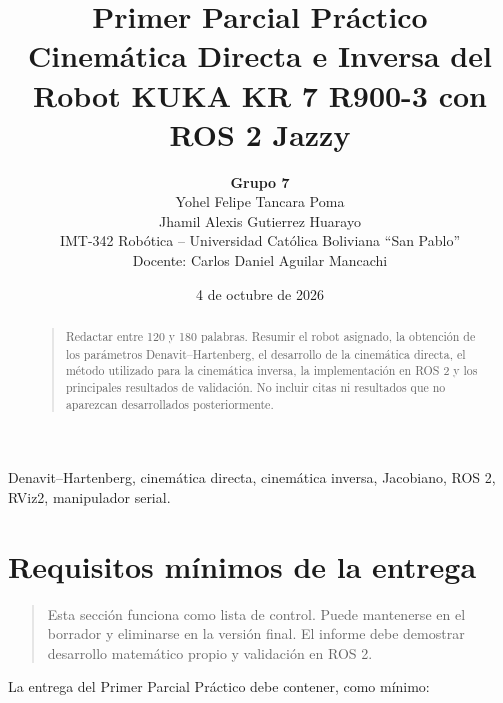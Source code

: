 \documentclass[journal]{IEEEtran}
\title{Primer Parcial Práctico\\
Cinemática Directa e Inversa del Robot KUKA KR 7 R900-3 con ROS 2 Jazzy}
\author{
\textbf{Grupo 7}\\
Yohel Felipe Tancara Poma\\
Jhamil Alexis Gutierrez Huarayo\\
IMT-342 Robótica -- Universidad Católica Boliviana ``San Pablo''\\
Docente: Carlos Daniel Aguilar Mancachi
}
\date{4 de octubre de 2026}
\newcommand{\instr}[1]{%
\begin{quote}
\small
\noindent\textbf{\color{blue}{INSTRUCCIÓN:}} #1
\end{quote}
}
\newcommand{\pendiente}[1]{\textbf{\color{red}{[#1]}}}
\begin{document}
\maketitle

\begin{abstract}
\instr{Redactar entre 120 y 180 palabras. Resumir el robot asignado, la obtención de los parámetros Denavit--Hartenberg, el desarrollo de la cinemática directa, el método utilizado para la cinemática inversa, la implementación en ROS 2 y los principales resultados de validación. No incluir citas ni resultados que no aparezcan desarrollados posteriormente.}

\pendiente{REEMPLAZAR POR EL RESUMEN DEL GRUPO.}
\end{abstract}

\begin{IEEEkeywords}
Denavit--Hartenberg, cinemática directa, cinemática inversa, Jacobiano, ROS 2, RViz2, manipulador serial.
\end{IEEEkeywords}

\section{Requisitos mínimos de la entrega}

\instr{Esta sección funciona como lista de control. Puede mantenerse en el borrador y eliminarse en la versión final. El informe debe demostrar desarrollo matemático propio y validación en ROS 2.}

La entrega del Primer Parcial Práctico debe contener, como mínimo:
\end{document}
